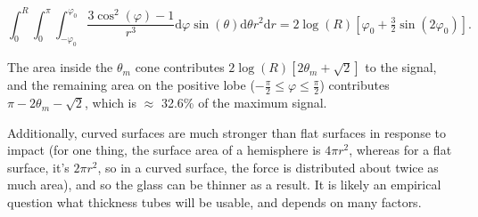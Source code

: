 \documentclass[PaulGanssle-Thesis.tex]{subfiles}
\begin{document}
\begin{equation}
\label{eqn:FieldFromVolume}
\int_{0}^{R}\int_{0}^{\pi}\int_{-\varphi_{0}}^{\varphi_{0}}\frac{3\cos^2(\varphi)-1}{r^3}\mathrm{d}\varphi\sin(\theta)\mathrm{d}\theta r^2\mathrm{d}r = 2\log(R)\left[\varphi_0 + \tfrac{3}{2}\sin(2\varphi_{0})\right].
\end{equation}

The area inside the $\theta_{m}$ cone contributes $2\log(R)\left[2\theta_{m} + \sqrt{2}\right]$ to the signal, and the remaining area on the positive lobe ($-\tfrac{\pi}{2} \leq \varphi \leq \tfrac{\pi}{2}$) contributes $\pi - 2\theta_{m} - \sqrt{2}$, which is $\approx$ 32.6\% of the maximum signal. 

 Additionally, curved surfaces are much stronger than flat surfaces in response to impact (for one thing, the surface area of a hemisphere is $4\pi r^2$, whereas for a flat surface, it's $2\pi r^2$, so in a curved surface, the force is distributed about twice as much area), and so the glass can be thinner as a result. It is likely an empirical question what thickness tubes will be usable, and depends on many factors.
\end{document}
